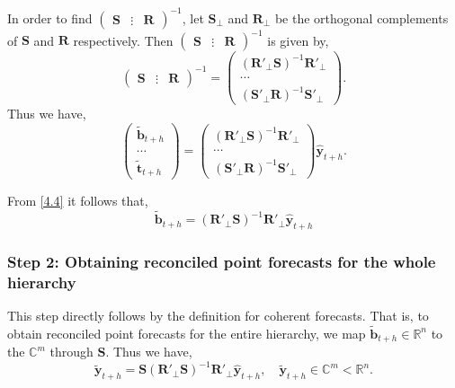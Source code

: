 \documentclass[a4paper, 11pt]{article}
\begin{document}
In order to find $\begin{pmatrix}\bm{S} & \vdots& \bm{R}\end{pmatrix}^{-1}$, let $\bm{S}_{\bot}$ and $\bm{R}_{\bot}$ be the orthogonal complements of $\bm{S}$ and $\bm{R}$
respectively. Then $\begin{pmatrix}\bm{S} & \vdots& \bm{R}\end{pmatrix}^{-1}$ is given by,
\begin{equation}
\begin{pmatrix}\bm{S} & \vdots& \bm{R}\end{pmatrix}^{-1} = \begin{pmatrix}
(\bm{R}'_\bot \bm{S})^{-1}\bm{R}'_\bot \\ \cdots \\ (\bm{S}'_\bot \bm{R})^{-1}\bm{S}'_\bot
\end{pmatrix}.
\end{equation}
Thus we have,
\begin{equation} \label{4.4}
\begin{pmatrix}
\tilde{\bm{b}}_{t+h} \\ \cdots \\ \tilde{\bm{t}}_{t+h}
\end{pmatrix} = \begin{pmatrix}
(\bm{R}'_\bot \bm{S})^{-1}\bm{R}'_\bot \\ \cdots \\ (\bm{S}'_\bot \bm{R})^{-1}\bm{S}'_\bot
\end{pmatrix}\hat{\bm{y}}_{t+h}.
\end{equation}

From \eqref{4.4} it follows that,
\begin{equation}
\tilde{\bm{b}}_{t+h}=(\bm{R}'_\bot \bm{S})^{-1}\bm{R}'_\bot \hat{\bm{y}}_{t+h}
\end{equation}

\subsubsection*{Step 2: Obtaining reconciled point forecasts for the whole hierarchy}

This step directly follows by the definition for coherent forecasts. That is, to obtain reconciled point forecasts for the entire hierarchy, we map $\tilde{\bm{b}}_{t+h} \in \mathbb{R}^n$ to the $\mathbb{C}^m$ through $\bm{S}$. Thus we have, 
\begin{equation}
\tilde{\bm{y}}_{t+h}=\bm{S}(\bm{R}'_\bot \bm{S})^{-1}\bm{R}'_\bot \hat{\bm{y}}_{t+h}, \quad \tilde{\bm{y}}_{t+h} \in \mathbb{C}^m<\mathbb{R}^n.
\end{equation}
\end{document}

